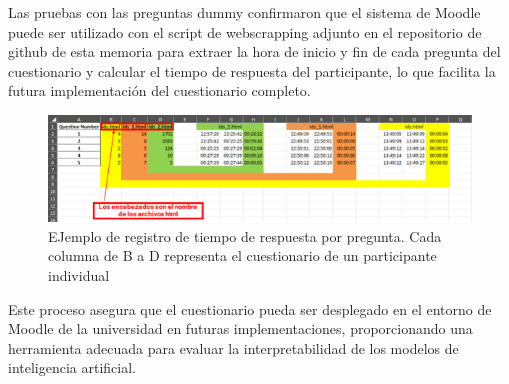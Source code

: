 Las pruebas con las preguntas dummy confirmaron que el sistema de Moodle puede ser utilizado con el script de webscrapping adjunto en el repositorio de github de esta memoria para extraer la hora de inicio y fin de cada pregunta del cuestionario y calcular el tiempo de respuesta del participante, lo que facilita la futura implementación del cuestionario completo.

\begin{figure}[h]
    \centering
    \includegraphics[width=0.9\linewidth]{include/resultados_excel.png}
    \caption{EJemplo de registro de tiempo de respuesta por pregunta. Cada columna de B a D representa el cuestionario de un participante individual}
    \label{fig:nasa-tlx-propio__}
\end{figure}




Este proceso asegura que el cuestionario pueda ser desplegado en el entorno de Moodle de la universidad en futuras implementaciones, proporcionando una herramienta adecuada para evaluar la interpretabilidad de los modelos de inteligencia artificial.





 
